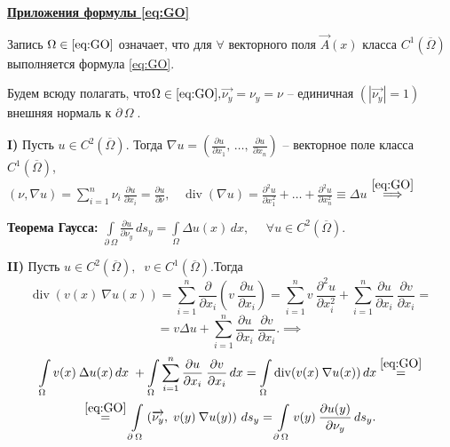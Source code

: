\noindent\textbf{\underline{Приложения формулы \eqref{eq:GO}}}

 Запись $\Omega \in \eqref{eq:GO}$ означает, что для $\forall$ векторного поля $\overrightarrow{A}(x)$ класса $C^1(\overline{\Omega})$ выполняется формула \eqref{eq:GO}.

\noindent Будем всюду полагать, что\quad $\Omega\in \eqref{eq:GO},$\quad $\overrightarrow{\nu_y} = \nu_y = \nu $ -- единичная $(|\overrightarrow{\nu_y}|=1)$ внешняя нормаль к $\partial \,\Omega\;$. 

\textbf{I)} Пусть $u \in C^2(\overline{\Omega})$.\; Тогда $\displaystyle\nabla u = \left( \frac{\partial u}{\partial x_1},\,\ldots,\, \frac{\partial u}{\partial x_n} \right)$ -- векторное поле класса $C^1(\overline{\Omega})$,\\ $\displaystyle(\nu, \nabla u) = \sum\limits_{i=1}^n \nu_i\,\frac{\partial u}{\partial x_i} = \frac{\partial u}{\partial \nu}, \;\;$ $\displaystyle \operatorname{div}(\nabla u) = \frac{\partial^2 u}{\partial x_1^2} + \ldots + \frac{\partial^2 u}{\partial x_n^2}\equiv\Delta u$ 
$\overset{\eqref{eq:GO}}{\implies}$ 

\textbf{Теорема Гаусса:}
$
\int\limits_{\partial\:\Omega} \frac{\partial u}{\partial \nu_y }\, ds_y = \int\limits_\Omega \Delta u(x)\, dx, $ $\quad \forall u\in C^2(\overline{\Omega}).$

\noindent\textbf{II)} Пусть $u \in C^2(\overline{\Omega}), \;\; v \in C^1(\overline{\Omega})$.\quad Тогда
$$
\operatorname{div}(v(x)\:\nabla u(x)) = \sum\limits_{i = 1}^n \frac{\partial}{\partial x_i} \left( v\: \frac{\partial u}{\partial x_i}\right) = 
\sum\limits_{i = 1}^n v \: \frac{\partial^2 u}{\partial x_i^2} + \sum\limits_{i = 1}^n \frac{\partial u}{\partial x_i}\:\frac{\partial v}{\partial x_i} =$$
$$
= v\Delta u + \sum\limits_{i = 1}^n \frac{\partial u}{\partial x_i}\:\frac{\partial v}{\partial x_i}. \implies
$$
\begin{multline*}
\int\limits_{\Omega}v(x)\:\Delta u(x)\, dx\; + \int\limits_\Omega\sum\limits_{i = 1}^n \frac{\partial u}{\partial x_i}\:\frac{\partial v}{\partial x_i}\, dx = \int\limits_\Omega \operatorname{div}(v(x)\:\nabla u(x))\,dx \overset{\eqref{eq:GO}}{=} \\ \overset{\eqref{eq:GO}}{=} \int\limits_{\partial\:\Omega}\left(\overrightarrow{\nu_y},\; v(y)\:\nabla u(y)\right)\,ds_y = \int\limits_{\partial\:\Omega} v(y)\:\frac{\partial u(y)}{\partial \nu_y}\,ds_y.
\end{multline*}

